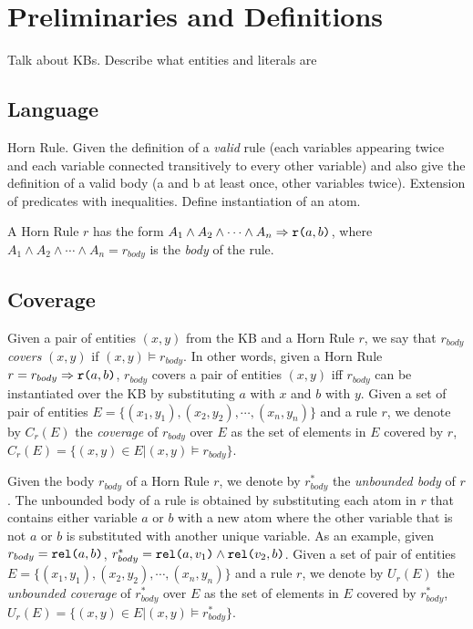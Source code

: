 \section{Preliminaries and Definitions}
{\color{red} Talk about KBs. Describe what entities and literals are}

\subsection{Language} \label{sec:language}
{\color{red} Horn Rule. Given the definition of a \emph{valid} rule (each variables appearing twice and each variable connected transitively to every other variable) and also give the definition of a valid body (a and b at least once, other variables twice).
Extension of predicates with inequalities.
Define instantiation of an atom.}


A Horn Rule $r$ has the form $A_1 \wedge A_2 \wedge \cdots \wedge A_n \Rightarrow \texttt{r(}a,b\texttt{)}$, where  $A_1 \wedge A_2 \wedge \cdots \wedge A_n = r_{body}$ is the \emph{body} of the rule.

\subsection{Coverage}
Given a pair of entities $(x,y)$ from the KB and a Horn Rule $r$, we say that $r_{body}$ \emph{covers} $(x,y)$ if
$(x,y) \models r_{body}$. In other words, given a Horn Rule $r = r_{body} \Rightarrow \texttt{r(}a,b\texttt{)}$, $r_{body}$ covers a pair of entities $(x,y)$ iff $r_{body}$ can be instantiated over the KB by substituting $a$ with $x$ and $b$ with $y$. Given a set of pair of entities $E = \{(x_1,y_1),(x_2,y_2),\cdots,(x_n,y_n)\}$ and a rule $r$, we denote by $C_r(E)$ the \emph{coverage} of $r_{body}$ over $E$ as the set of elements in $E$ covered by $r$, $C_r(E)=\{(x,y) \in E | (x,y) \models r_{body}\}$.

Given the body $r_{body}$ of a Horn Rule $r$, we denote by $r^{*}_{body}$ the \emph{unbounded body} of $r$. The unbounded body of a rule is obtained by substituting each atom in $r$ that contains either variable $a$ or $b$ with a new atom where the other variable that is not $a$ or $b$ 
is substituted with another unique variable. As an example, given $r_{body} = \texttt{rel(}a,b\texttt{)}$, $r^{*}_{body} = \texttt{rel(}a,v_1\texttt{)} \wedge \texttt{rel(}v_2,b\texttt{)}$.
Given a set of pair of entities $E = \{(x_1,y_1),(x_2,y_2),\cdots,(x_n,y_n)\}$ and a rule $r$, we denote by $U_r(E)$ the \emph{unbounded coverage} of $r^{*}_{body}$ over $E$ as the set of elements in $E$ covered by $r^{*}_{body}$, $U_r(E)=\{(x,y) \in E | (x,y) \models r^{*}_{body}\}$.

